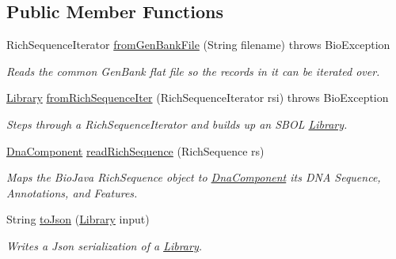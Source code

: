 \subsection*{Public Member Functions}
\begin{DoxyCompactItemize}
\item 
RichSequenceIterator \hyperlink{classorg_1_1sbolstandard_1_1lib_s_b_o_lj_1_1_s_b_o_lutil_af861065d53a033149b9ef1a3df87aed9}{fromGenBankFile} (String filename)  throws BioException 
\begin{DoxyCompactList}\small\item\em Reads the common GenBank flat file so the records in it can be iterated over. \item\end{DoxyCompactList}\item 
\hyperlink{classorg_1_1sbolstandard_1_1lib_s_b_o_lj_1_1_library}{Library} \hyperlink{classorg_1_1sbolstandard_1_1lib_s_b_o_lj_1_1_s_b_o_lutil_adb487cad6c1ad9f5c84c1b7bbdc7dbec}{fromRichSequenceIter} (RichSequenceIterator rsi)  throws BioException 
\begin{DoxyCompactList}\small\item\em Steps through a RichSequenceIterator and builds up an SBOL \hyperlink{classorg_1_1sbolstandard_1_1lib_s_b_o_lj_1_1_library}{Library}. \item\end{DoxyCompactList}\item 
\hyperlink{classorg_1_1sbolstandard_1_1lib_s_b_o_lj_1_1_dna_component}{DnaComponent} \hyperlink{classorg_1_1sbolstandard_1_1lib_s_b_o_lj_1_1_s_b_o_lutil_a57f85ac9e2ce0a55452b29d308df8c42}{readRichSequence} (RichSequence rs)
\begin{DoxyCompactList}\small\item\em Maps the BioJava RichSequence object to \hyperlink{classorg_1_1sbolstandard_1_1lib_s_b_o_lj_1_1_dna_component}{DnaComponent} its DNA Sequence, Annotations, and Features. \item\end{DoxyCompactList}\item 
String \hyperlink{classorg_1_1sbolstandard_1_1lib_s_b_o_lj_1_1_s_b_o_lutil_ae5804516e781d98986a524496f849866}{toJson} (\hyperlink{classorg_1_1sbolstandard_1_1lib_s_b_o_lj_1_1_library}{Library} input)
\begin{DoxyCompactList}\small\item\em Writes a Json serialization of a \hyperlink{classorg_1_1sbolstandard_1_1lib_s_b_o_lj_1_1_library}{Library}. \item\end{DoxyCompactList}\item 

\end{DoxyCompactItemize}
